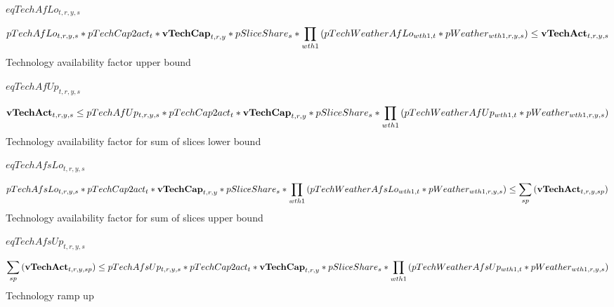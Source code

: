 \documentclass{article}
\begin{document}
$eqTechAfLo_{t,r,y,s}$





\begin{dmath} 
pTechAfLo_{t,r,y,s}*pTechCap2act_{t}*{\bf vTechCap}_{t,r,y}*pSliceShare_{s}*\prod_{wth1}{\left(pTechWeatherAfLo_{wth1,t}*pWeather_{wth1,r,y,s}\right)}  \le  {\bf vTechAct}_{t,r,y,s}
\end{dmath} 
Technology availability factor upper bound







$eqTechAfUp_{t,r,y,s}$





\begin{dmath} 
{\bf vTechAct}_{t,r,y,s}  \le  pTechAfUp_{t,r,y,s}*pTechCap2act_{t}*{\bf vTechCap}_{t,r,y}*pSliceShare_{s}*\prod_{wth1}{\left(pTechWeatherAfUp_{wth1,t}*pWeather_{wth1,r,y,s}\right)}
\end{dmath} 
Technology availability factor for sum of slices lower bound







$eqTechAfsLo_{t,r,y,s}$





\begin{dmath} 
pTechAfsLo_{t,r,y,s}*pTechCap2act_{t}*{\bf vTechCap}_{t,r,y}*pSliceShare_{s}*\prod_{wth1}{\left(pTechWeatherAfsLo_{wth1,t}*pWeather_{wth1,r,y,s}\right)}  \le  \sum_{sp}{\left({\bf vTechAct}_{t,r,y,sp}\right)}
\end{dmath} 
Technology availability factor for sum of slices upper bound







$eqTechAfsUp_{t,r,y,s}$





\begin{dmath} 
\sum_{sp}{\left({\bf vTechAct}_{t,r,y,sp}\right)}  \le  pTechAfsUp_{t,r,y,s}*pTechCap2act_{t}*{\bf vTechCap}_{t,r,y}*pSliceShare_{s}*\prod_{wth1}{\left(pTechWeatherAfsUp_{wth1,t}*pWeather_{wth1,r,y,s}\right)}
\end{dmath} 
Technology ramp up
\end{document}
